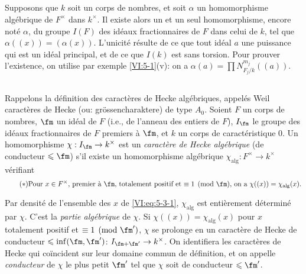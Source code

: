 \subsection{}\label{VI:5-2}

Supposons que $k$ soit un corps de nombres, et soit $\alpha$ un homomorphisme 
algébrique de $F^\times$ dans $k^\times$. Il existe alors un et un seul 
homomorphisme, encore noté $\alpha$, du groupe $I(F)$ des idéaux 
fractionnaires de $F$ dans celui de $k$, tel que $\alpha((x))=(\alpha(x))$. 
L'unicité résulte de ce que tout idéal $a$ une puissance qui est un 
idéal principal, et de ce que $I(k)$ est sans torsion. Pour prouver 
l'existence, on utilise par exemple \ref{VI:5-1}(v): on a 
$\alpha(a) = \prod N_{F_j/k}^{m_j}((a))$. 





\subsection{}\label{VI:5-3}

Rappelons la définition des caractères de Hecke algébriques, appelés 
Weil caractères de Hecke (ou: gr\"ossencharaktere) de type $A_0$. Soient $F$ 
un corps de nombres, $\fm$ un idéal de $F$ (i.e., de l'anneau des entiers de 
$F$), $I_\fm$ le groupe des idéaux fractionnaires de $F$ premiers à $\fm$, 
et $k$ un corps de caractéristique $0$. Un homomorphisme 
$\chi:I_\fm \to k^\times$ est un \emph{caractère de Hecke algébrique} (de 
conducteur $\leqslant \fm$) s'il existe un homomorphisme algébrique 
$\chi_\text{alg}:F^\times \to k^\times$ vérifiant 
\begin{equation*}\tag{$*$}\label{VI:eq:5-3-1}
\text{Pour $x\in F^\times$, premier à $\fm$, totalement positif et 
$\equiv 1\pmod\fm$, on a $\chi((x))=\chi_\text{alg}(x)$.}
\end{equation*}

Par densité de l'ensemble des $x$ de \eqref{VI:eq:5-3-1}, $\chi_\text{alg}$ 
est entièrement déterminé par $\chi$. C'est la \emph{partie algébrique} 
de $\chi$. Si $\chi((x))=\chi_\text{alg}(x)$ pour $x$ totalement positif et 
$\equiv 1\pmod{\fm'}$, $\chi$ se prolonge en un caractère de Hecke de 
conducteur $\leqslant \inf(\fm,\fm')$: $I_{\fm+\fm'}\to k^\times$. On 
identifiera les caractères de Hecke qui coïncident sur leur domaine commun de 
définition, et on appelle \emph{conducteur} de $\chi$ le plus petit $\fm'$ 
tel que $\chi$ soit de conducteur $\leqslant \fm'$. 





